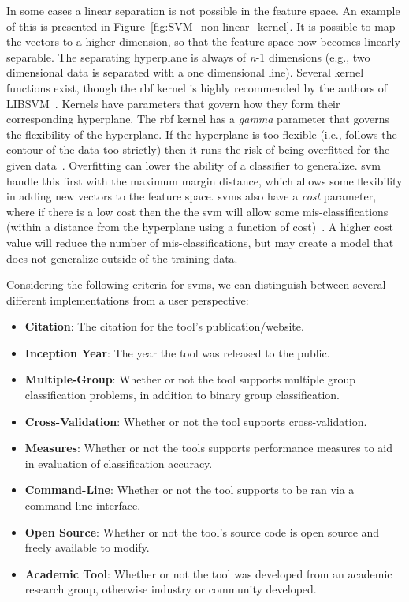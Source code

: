 In some cases a linear separation is not possible in the feature space. An example of this is presented in Figure~\ref{fig:SVM_non-linear_kernel}. It is possible to map the vectors to a higher dimension, so that the feature space now becomes linearly separable. The separating hyperplane is always of \emph{n}-1 dimensions (e.g., two dimensional data is separated with a one dimensional line). Several kernel functions exist, though the \gls{rbf} kernel is highly recommended by the authors of LIBSVM~\cite{HCL03}. Kernels have parameters that govern how they form their corresponding hyperplane. The \gls{rbf} kernel has a \emph{gamma} parameter that governs the flexibility of the hyperplane. If the hyperplane is too flexible (i.e., follows the contour of the data too strictly) then it runs the risk of being overfitted for the given data~\cite{BW10}. Overfitting can lower the ability of a classifier to generalize. \gls{svm} handle this first with the maximum margin distance, which allows some flexibility in adding new vectors to the feature space. \gls{svm}s also have a \emph{cost} parameter, where if there is a low cost then the the \gls{svm} will allow some mis-classifications (within a distance from the hyperplane using a function of cost)~\cite{BW10}. A higher cost value will reduce the number of mis-classifications, but may create a model that does not generalize outside of the training data.

Considering the following criteria for \gls{svm}s, we can distinguish between several different implementations from a user perspective:

\begin{itemize}
  \item \textbf{Citation}: The citation for the tool's publication/website.
  \item \textbf{Inception Year}: The year the tool was released to the public.
  \item \textbf{Multiple-Group}: Whether or not the tool supports multiple group classification problems, in addition to binary group classification.
  \item \textbf{Cross-Validation}: Whether or not the tool supports cross-validation.
  \item \textbf{Measures}: Whether or not the tools supports performance measures to aid in evaluation of classification accuracy.
  \item \textbf{Command-Line}: Whether or not the tool supports to be ran via a command-line interface.
  \item \textbf{Open Source}: Whether or not the tool's source code is open source and freely available to modify.
  \item \textbf{Academic Tool}: Whether or not the tool was developed from an academic research group, otherwise industry or community developed.
\end{itemize}

